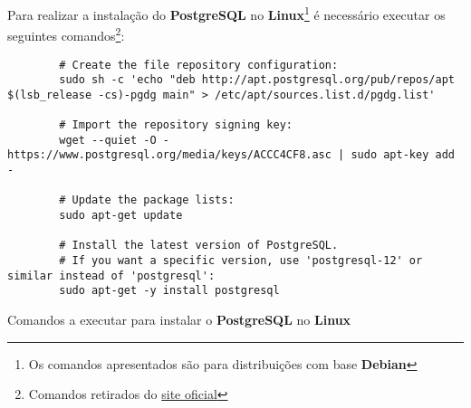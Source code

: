 
Para realizar a instalação do \textbf{PostgreSQL} no \textbf{Linux}\footnote{Os comandos apresentados são para distribuições com base \textbf{Debian}} é necessário executar os seguintes comandos\footnote{Comandos retirados do \href{https://www.postgresql.org/download/linux/debian/}{site oficial}}:

\begin{longlisting}
	\begin{verbatim}
		# Create the file repository configuration:
		sudo sh -c 'echo "deb http://apt.postgresql.org/pub/repos/apt $(lsb_release -cs)-pgdg main" > /etc/apt/sources.list.d/pgdg.list'

		# Import the repository signing key:
		wget --quiet -O - https://www.postgresql.org/media/keys/ACCC4CF8.asc | sudo apt-key add -

		# Update the package lists:
		sudo apt-get update

		# Install the latest version of PostgreSQL.
		# If you want a specific version, use 'postgresql-12' or similar instead of 'postgresql':
		sudo apt-get -y install postgresql
	\end{verbatim}

	\caption{Comandos a executar para instalar o \textbf{PostgreSQL} no \textbf{Linux}}
\end{longlisting}
